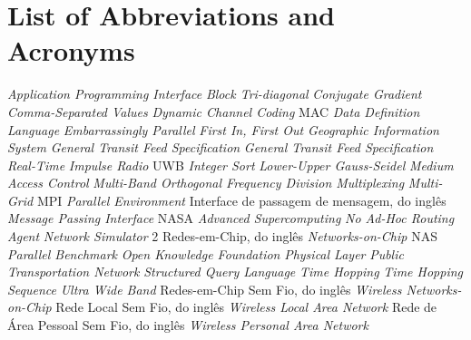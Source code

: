 \chapter*{List of Abbreviations and Acronyms}


\begin{acronym}
 {\textit{Application Programming Interface}}
 {\textit{Block Tri-diagonal}}
 {\textit{Conjugate Gradient}}
 {\textit{Comma-Separated Values}}
 {\textit{Dynamic Channel Coding} MAC}
 {\textit{Data Definition Language}}
 {\textit{Embarrassingly Parallel}}
 {\textit{First In, First Out}}
 {\textit{Geographic Information System}}
 {\textit{General Transit Feed Specification}}
 {\textit{General Transit Feed Specification Real-Time}}
 {\textit{Impulse Radio} UWB}
 {\textit{Integer Sort}}
 {\textit{Lower-Upper Gauss-Seidel}}
 {\textit{Medium Access Control}}
 {\textit{Multi-Band Orthogonal Frequency Division Multiplexing}}
 {\textit{Multi-Grid}}
 {MPI \textit{Parallel Environment}}
 {Interface de passagem de mensagem, do inglês \textit{Message Passing Interface}}
 {NASA \textit{Advanced Supercomputing}}
 {\textit{No Ad-Hoc Routing Agent}} 
 {\textit{Network Simulator} 2}
 {Redes-em-Chip, do inglês \textit{Networks-on-Chip}}
 {NAS \textit{Parallel Benchmark}}
 {\textit{Open Knowledge Foundation}}
 {\textit{Physical Layer}}
 {\textit{Public Transportation Network}}
 {\textit{Structured Query Language}}
 {\textit{Time Hopping}}
 {\textit{Time Hopping Sequence}}
 {\textit{Ultra Wide Band}}
 {Redes-em-Chip Sem Fio, do inglês \textit{Wireless Networks-on-Chip}}
 {Rede Local Sem Fio, do inglês \textit{Wireless Local Area Network}}
 {Rede de Área Pessoal Sem Fio, do inglês \textit{Wireless Personal Area Network}}
\end{acronym}